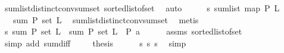 \begin{isabellebody}
\ sum{\isacharunderscore}{\kern0pt}list{\isacharunderscore}{\kern0pt}distinct{\isacharunderscore}{\kern0pt}conv{\isacharunderscore}{\kern0pt}sum{\isacharunderscore}{\kern0pt}set\ sorted{\isacharunderscore}{\kern0pt}list{\isacharunderscore}{\kern0pt}of{\isacharunderscore}{\kern0pt}set{\isacharparenleft}{\kern0pt}{}{\isacharparenright}{\kern0pt}\ \isamarkupfalse%
\ auto\isanewline
\ \ \isamarkupfalse%
\ \isamarkupfalse%
\ s{\isacharunderscore}{\kern0pt}{}{\isacharcolon}{\kern0pt}\ {\isachardoublequoteopen}sum{\isacharunderscore}{\kern0pt}list\ {\isacharparenleft}{\kern0pt}{\isacharparenleft}{\kern0pt}map\ P{\isacharparenright}{\kern0pt}\ {\isacharquery}{\kern0pt}L{}{\isacharparenright}{\kern0pt}\ \isanewline
\ \ {\isacharequal}{\kern0pt}\ sum\ P\ {\isacharparenleft}{\kern0pt}set\ {\isacharquery}{\kern0pt}L{}{\isacharparenright}{\kern0pt}{\isachardoublequoteclose}\ \isamarkupfalse%
\ sum{\isacharunderscore}{\kern0pt}list{\isacharunderscore}{\kern0pt}distinct{\isacharunderscore}{\kern0pt}conv{\isacharunderscore}{\kern0pt}sum{\isacharunderscore}{\kern0pt}set\ \isamarkupfalse%
\ metis\isanewline
\ \ \isamarkupfalse%
\ s{\isacharunderscore}{\kern0pt}{}{\isacharcolon}{\kern0pt}\ {\isachardoublequoteopen}sum\ P\ {\isacharparenleft}{\kern0pt}set\ {\isacharquery}{\kern0pt}L{}{\isacharparenright}{\kern0pt}\ {\isacharequal}{\kern0pt}\ sum\ P\ {\isacharparenleft}{\kern0pt}set\ {\isacharquery}{\kern0pt}L{}{\isacharparenright}{\kern0pt}\ {\isacharminus}{\kern0pt}\ {\isacharparenleft}{\kern0pt}P\ a{\isacharparenright}{\kern0pt}{\isachardoublequoteclose}\isanewline
\ \ \ \ \isamarkupfalse%
\ assms\ sorted{\isacharunderscore}{\kern0pt}list{\isacharunderscore}{\kern0pt}of{\isacharunderscore}{\kern0pt}set{\isacharparenleft}{\kern0pt}{}{\isacharparenright}{\kern0pt}\isanewline
\ \ \ \ \isamarkupfalse%
\ {\isacharparenleft}{\kern0pt}simp\ add{\isacharcolon}{\kern0pt}\ sum{\isacharunderscore}{\kern0pt}diff{}{\isacharparenright}{\kern0pt}\ \isanewline
\ \ \isamarkupfalse%
\ {\isacharquery}{\kern0pt}thesis\isanewline
\ \ \ \ \isamarkupfalse%
\ s{\isacharunderscore}{\kern0pt}{}\ s{\isacharunderscore}{\kern0pt}{}\ s{\isacharunderscore}{\kern0pt}{}\ \isamarkupfalse%
\ simp\isanewline
{}\isamarkupfalse%
%
\endisatagproof
{\isafoldproof}%
%
\isadelimproof

\end{isabellebody}
